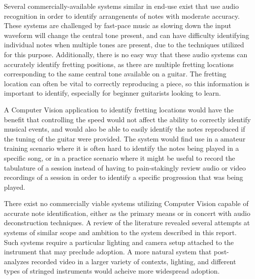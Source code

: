 Several commercially-available systems\cite{chordify,riffstation} similar in end-use exist
that use audio recognition in order to identify arrangenents of notes with moderate accuracy.
These systems are challenged by fast-pace music as slowing down the input waveform will change
the central tone present, and can have difficulty identifying individual notes when multiple
tones are present, due to the techniques utilized for this purpose. Additionally, there is no
easy way that these audio systems can accurately identify fretting positions, as there are
multiple fretting locations corresponding to the same central tone available on a guitar.
The fretting location can often be vital to correctly reproducing a piece, so this information
is important to identify, especially for beginner guitarists looking to learn.
\par
A Computer Vision application to identify fretting locations would have the benefit that controlling
the speed would not affect the ability to correctly identify musical events, and would also be
able to easily identify the notes reproduced if the tuning of the guitar were provided.
The system would find use in a amateur training scenario where it is often hard to identify the
notes being played in a specific song, or in a practice scenario where it might be useful to record
the tabulature of a session instead of having to pain-stakingly review audio or video recordings of
a session in order to identify a specific progression that was being played.
\par
There exist no commercially viable systems utilizing Computer Vision capable of accurate note
identification, either as the primary means or in concert with audio deconstruction techniques.
A review of the literature revealed several attempts at systems of similar scope and ambition to
the system described in this report\cite{GuitarTabulizer,CVFinger}. Such systems require a
particular lighting and camera setup attached to the instrument that may preclude adoption.
A more natural system that post-analyzes recorded video in a larger variety of contexts, lighting,
and different types of stringed instruments would acheive more widespread adoption.
